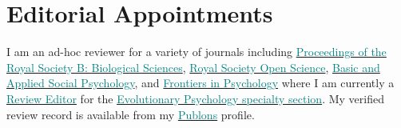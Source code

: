 \documentclass[11pt, a4paper]{awesome-cv}
\begin{document}
\hypertarget{editorial-appointments}{%
\section{Editorial Appointments}\label{editorial-appointments}}

I am an ad-hoc reviewer for a variety of journals including \href{https://royalsocietypublishing.org/journal/rspb}{\textcolor{teal}{Proceedings of the Royal Society B: Biological Sciences}}, \href{https://royalsocietypublishing.org/journal/rsos}{\textcolor{teal}{Royal Society Open Science}}, \href{https://www.tandfonline.com/toc/hbas20/current}{\textcolor{teal}{Basic and Applied Social Psychology}}, and \href{https://www.frontiersin.org/journals/psychology}{\textcolor{teal}{Frontiers in Psychology}} where I am currently a \href{https://loop.frontiersin.org/people/438954/overview}{\textcolor{teal}{Review Editor}} for the \href{https://www.frontiersin.org/journals/psychology/sections/evolutionary-psychology}{\textcolor{teal}{Evolutionary Psychology specialty section}}. My verified review record is available from my \href{https://publons.com/researcher/1333339/juan-david-leongomez/}{\textcolor{teal}{Publons}} profile.
\end{document}
